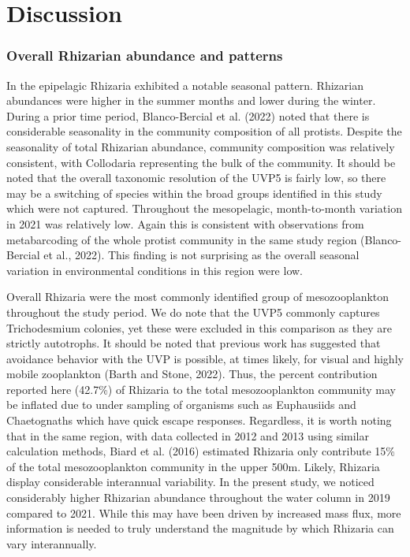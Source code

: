 \documentclass[
]{article}
\begin{document}
\hypertarget{discussion}{%
\section{Discussion}\label{discussion}}

\hypertarget{overall-rhizarian-abundance-and-patterns}{%
\subsubsection{Overall Rhizarian abundance and
patterns}\label{overall-rhizarian-abundance-and-patterns}}

In the epipelagic Rhizaria exhibited a notable seasonal pattern.
Rhizarian abundances were higher in the summer months and lower during
the winter. During a prior time period, Blanco-Bercial et al. (2022)
noted that there is considerable seasonality in the community
composition of all protists. Despite the seasonality of total Rhizarian
abundance, community composition was relatively consistent, with
Collodaria representing the bulk of the community. It should be noted
that the overall taxonomic resolution of the UVP5 is fairly low, so
there may be a switching of species within the broad groups identified
in this study which were not captured. Throughout the mesopelagic,
month-to-month variation in 2021 was relatively low. Again this is
consistent with observations from metabarcoding of the whole protist
community in the same study region (Blanco-Bercial et al., 2022). This
finding is not surprising as the overall seasonal variation in
environmental conditions in this region were low.

Overall Rhizaria were the most commonly identified group of
mesozooplankton throughout the study period. We do note that the UVP5
commonly captures Trichodesmium colonies, yet these were excluded in
this comparison as they are strictly autotrophs. It should be noted that
previous work has suggested that avoidance behavior with the UVP is
possible, at times likely, for visual and highly mobile zooplankton
(Barth and Stone, 2022). Thus, the percent contribution reported here
(42.7\%) of Rhizaria to the total mesozooplankton community may be
inflated due to under sampling of organisms such as Euphausiids and
Chaetognaths which have quick escape responses. Regardless, it is worth
noting that in the same region, with data collected in 2012 and 2013
using similar calculation methods, Biard et al. (2016) estimated
Rhizaria only contribute 15\% of the total mesozooplankton community in
the upper 500m. Likely, Rhizaria display considerable interannual
variability. In the present study, we noticed considerably higher
Rhizarian abundance throughout the water column in 2019 compared to
2021. While this may have been driven by increased mass flux, more
information is needed to truly understand the magnitude by which
Rhizaria can vary interannually.
\end{document}
